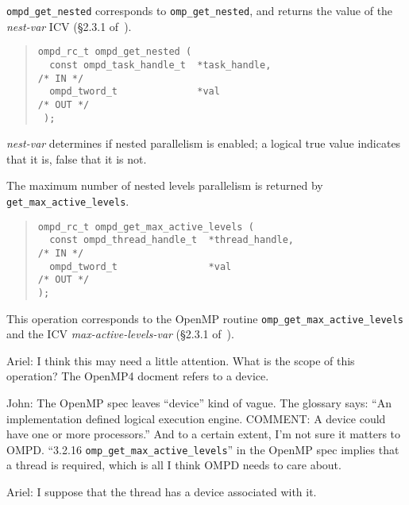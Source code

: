 \verb|ompd_get_nested| corresponds to \verb|omp_get_nested|,
and returns the value of the \emph{nest-var} ICV (\S2.3.1 of~\cite{OpenMP}).
\begin{quote}
\begin{lstlisting}
ompd_rc_t ompd_get_nested (
  const ompd_task_handle_t  *task_handle,                           /* IN */
  ompd_tword_t              *val                                   /* OUT */
 );
\end{lstlisting}
\end{quote}
\emph{nest-var} determines if nested parallelism is enabled;
a logical true value indicates that it is, false that it is not.
 
The maximum number of nested levels parallelism is returned by
\verb|get_max_active_levels|.
\begin{quote}
\begin{lstlisting}
ompd_rc_t ompd_get_max_active_levels (
  const ompd_thread_handle_t  *thread_handle,                       /* IN */
  ompd_tword_t                *val                                 /* OUT */
);
\end{lstlisting}
\end{quote}
This operation corresponds to the OpenMP routine
\verb|omp_get_max_active_levels|
and the ICV \emph{max-active-levels-var} (\S2.3.1 of~\cite{OpenMP}).%

\begin{notes}
Ariel: I think this may need a little attention.
What is the scope of this operation?  The OpenMP4 docment refers
to a device.

John: The OpenMP spec leaves ``device'' kind of vague.
The glossary says: ``An implementation defined logical execution engine.
COMMENT: A device could have one or more processors.''
And to a certain extent, I'm not sure it matters to OMPD.
``3.2.16 \texttt{omp\_get\_max\_active\_levels}'' in the OpenMP spec
implies that a thread is required, which is all I think OMPD
needs to care about.

Ariel:
I suppose that the thread has a device associated with it.
\end{notes}

